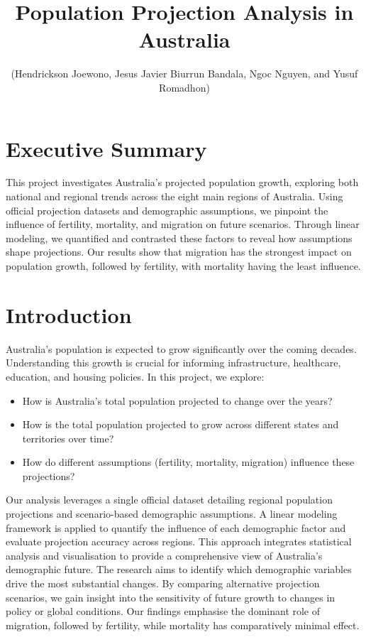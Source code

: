 \documentclass[
  11pt,
]{article}
\title{Population Projection Analysis in Australia}
\author{(Hendrickson Joewono, Jesus Javier Biurrun Bandala, Ngoc Nguyen,
and Yusuf Romadhon)}
\date{}
\renewcommand*\contentsname{Table of contents}
\newcommand\contentsname{Table of contents}
\begin{document}
\maketitle

\renewcommand*\contentsname{Table of contents}
{
\hypersetup{linkcolor=}
\setcounter{tocdepth}{2}
\tableofcontents
}

\newpage

\section{Executive Summary}\label{executive-summary}

This project investigates Australia's projected population growth,
exploring both national and regional trends across the eight main
regions of Australia. Using official projection datasets and demographic
assumptions, we pinpoint the influence of fertility, mortality, and
migration on future scenarios. Through linear modeling, we quantified
and contrasted these factors to reveal how assumptions shape
projections. Our results show that migration has the strongest impact on
population growth, followed by fertility, with mortality having the
least influence.

\section{Introduction}\label{introduction}

Australia's population is expected to grow significantly over the coming
decades. Understanding this growth is crucial for informing
infrastructure, healthcare, education, and housing policies. In this
project, we explore:

\begin{itemize}
\item
  How is Australia's total population projected to change over the
  years?
\item
  How is the total population projected to grow across different states
  and territories over time?
\item
  How do different assumptions (fertility, mortality, migration)
  influence these projections?
\end{itemize}

Our analysis leverages a single official dataset detailing regional
population projections and scenario-based demographic assumptions. A
linear modeling framework is applied to quantify the influence of each
demographic factor and evaluate projection accuracy across regions. This
approach integrates statistical analysis and visualisation to provide a
comprehensive view of Australia's demographic future. The research aims
to identify which demographic variables drive the most substantial
changes. By comparing alternative projection scenarios, we gain insight
into the sensitivity of future growth to changes in policy or global
conditions. Our findings emphasise the dominant role of migration,
followed by fertility, while mortality has comparatively minimal effect.
\end{document}
